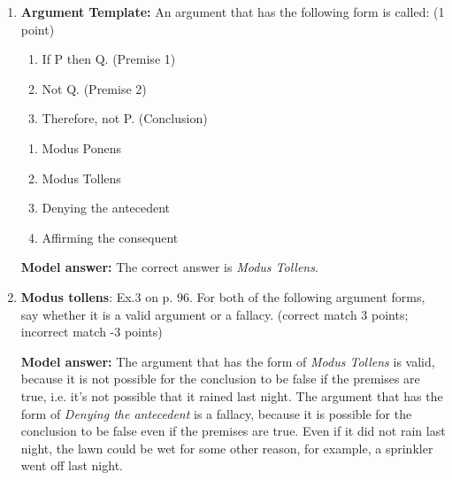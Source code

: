 \documentclass[a4,11pt]{article}
\newcommand{\6}{\mbox{$[\hspace*{-.6mm}[$}}
\newcommand{\9}{\mbox{$]\hspace*{-.6mm}]$}}
\begin{document}
\begin{enumerate}[leftmargin = 12pt]
Propositional logic formulae:

\begin{enumerate}[noitemsep]
\item $K \wedge S$
\item $K \vee A$
\item $K \wedge \neg S$
\item $\neg K \wedge A$
\item $\neg (K \vee A)$
\end{enumerate}

{\bf Model answer:} The English sentences in (a) - (e) are translated by the Propositional logic formulae in (a) - (e), respectively (i.e., in the order given).


\item {\bf Argument Template:} An argument that has the following form is called: (1 point)

\begin{enumerate}[noitemsep]
\item[] If P then Q.  \hfill (Premise 1)
\item[] Not Q.  \hfill  (Premise 2)
\item[] Therefore, not P. \hfill  (Conclusion)
\end{enumerate}

\begin{enumerate}[noitemsep]
\item Modus Ponens
\item Modus Tollens
\item Denying the antecedent
\item Affirming the consequent
\end{enumerate}

{\bf Model answer:} The correct answer is \textit{Modus Tollens}.

\item {\bf Modus tollens}: Ex.3 on p. 96. For both of the following argument forms, say whether it is a valid argument or a fallacy.  (correct match 3 points; incorrect match -3 points)

{\bf Model answer:} The argument that has the form of {\it Modus Tollens} is valid, because it is not possible for the conclusion to be false if the premises are true, i.e. it's not possible that it rained last night. The argument that has the form of {\it Denying the antecedent} is a fallacy, because it is possible for the conclusion to be false even if the premises are true. Even if it did not rain last night, the lawn could be wet for some other reason, for example, a sprinkler went off last night.



\end{enumerate}
\end{document}
